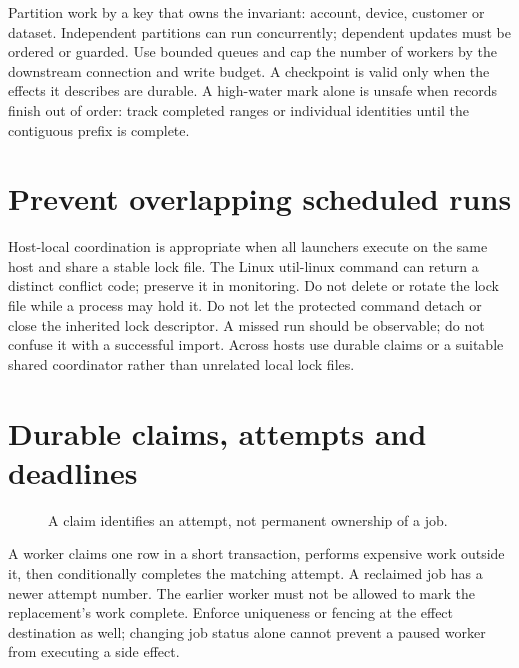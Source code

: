 Partition work by a key that owns the invariant: account, device, customer
or dataset. Independent partitions can run concurrently; dependent updates
must be ordered or guarded. Use bounded queues and cap the number of workers
by the downstream connection and write budget. A checkpoint is valid only
when the effects it describes are durable. A high-water mark alone is
unsafe when records finish out of order: track completed ranges or individual
identities until the contiguous prefix is complete.

\section{Prevent overlapping scheduled runs}
Host-local coordination is appropriate when all launchers execute on the
same host and share a stable lock file. The Linux util-linux 
command can return a distinct conflict code; preserve it in monitoring.
Do not delete or rotate the lock file while a process may hold it.
Do not let the protected command detach or close the inherited lock
descriptor. A missed run should be observable; do not confuse it with a
successful import. Across hosts use durable claims or a suitable shared
coordinator rather than unrelated local lock files.

\section{Durable claims, attempts and deadlines}
\begin{figure}[!htbp]\centering
{}
\caption{A claim identifies an attempt, not permanent ownership of a job.}
\end{figure}
A worker claims one row in a short transaction, performs expensive work
outside it, then conditionally completes the matching attempt. A reclaimed
job has a newer attempt number. The earlier worker must not be allowed
to mark the replacement's work complete. Enforce uniqueness or fencing at
the effect destination as well; changing job status alone cannot prevent
a paused worker from executing a side effect.

